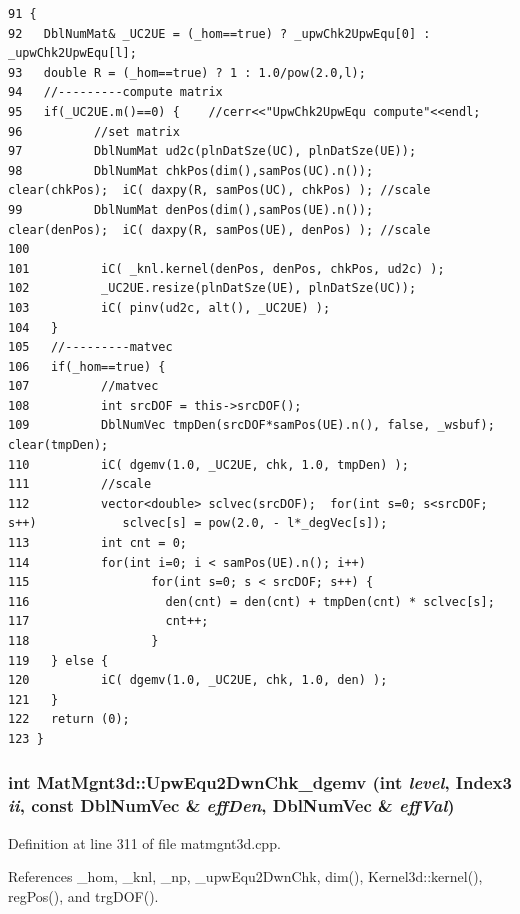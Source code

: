\footnotesize\begin{verbatim}91 {
92   DblNumMat& _UC2UE = (_hom==true) ? _upwChk2UpwEqu[0] : _upwChk2UpwEqu[l];
93   double R = (_hom==true) ? 1 : 1.0/pow(2.0,l);
94   //---------compute matrix
95   if(_UC2UE.m()==0) {    //cerr<<"UpwChk2UpwEqu compute"<<endl;
96          //set matrix
97          DblNumMat ud2c(plnDatSze(UC), plnDatSze(UE));
98          DblNumMat chkPos(dim(),samPos(UC).n());         clear(chkPos);  iC( daxpy(R, samPos(UC), chkPos) ); //scale
99          DblNumMat denPos(dim(),samPos(UE).n());         clear(denPos);  iC( daxpy(R, samPos(UE), denPos) ); //scale
100          
101          iC( _knl.kernel(denPos, denPos, chkPos, ud2c) );
102          _UC2UE.resize(plnDatSze(UE), plnDatSze(UC));
103          iC( pinv(ud2c, alt(), _UC2UE) );
104   }
105   //---------matvec
106   if(_hom==true) {
107          //matvec
108          int srcDOF = this->srcDOF();
109          DblNumVec tmpDen(srcDOF*samPos(UE).n(), false, _wsbuf);         clear(tmpDen);
110          iC( dgemv(1.0, _UC2UE, chk, 1.0, tmpDen) );
111          //scale
112          vector<double> sclvec(srcDOF);  for(int s=0; s<srcDOF; s++)            sclvec[s] = pow(2.0, - l*_degVec[s]);
113          int cnt = 0;
114          for(int i=0; i < samPos(UE).n(); i++)
115                 for(int s=0; s < srcDOF; s++) {
116                   den(cnt) = den(cnt) + tmpDen(cnt) * sclvec[s];
117                   cnt++;
118                 }
119   } else {
120          iC( dgemv(1.0, _UC2UE, chk, 1.0, den) );
121   }
122   return (0);
123 }
\end{verbatim}\normalsize 


\subsubsection{\setlength{\rightskip}{0pt plus 5cm}int Mat\-Mgnt3d::Upw\-Equ2Dwn\-Chk\_\-dgemv (int {\em level}, Index3 {\em ii}, const Dbl\-Num\-Vec \& {\em eff\-Den}, Dbl\-Num\-Vec \& {\em eff\-Val})}\label{classMatMgnt3d_265501b782aca2ac9f06197ab087e319_265501b782aca2ac9f06197ab087e319}




Definition at line 311 of file matmgnt3d.cpp.

References \_\-hom, \_\-knl, \_\-np, \_\-upw\-Equ2Dwn\-Chk, dim(), Kernel3d::kernel(), reg\-Pos(), and trg\-DOF().

